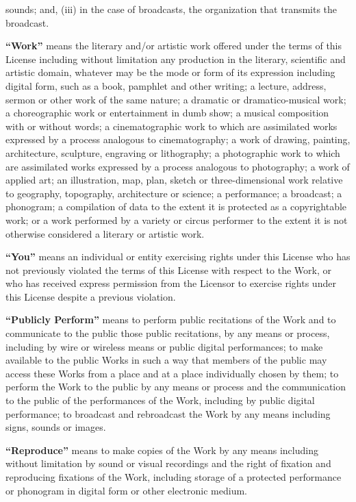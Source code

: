 \begin{doclicense@enumerate}
sounds; and, (iii) in the case of broadcasts, the
organization that transmits the broadcast.
\item \textbf{``Work''} means the literary and/or
artistic work offered under the terms of this License
including without limitation any production in the
literary, scientific and artistic domain, whatever may be
the mode or form of its expression including digital
form, such as a book, pamphlet and other writing; a
lecture, address, sermon or other work of the same
nature; a dramatic or dramatico-musical work; a
choreographic work or entertainment in dumb show; a
musical composition with or without words; a
cinematographic work to which are assimilated works
expressed by a process analogous to cinematography; a
work of drawing, painting, architecture, sculpture,
engraving or lithography; a photographic work to which
are assimilated works expressed by a process analogous to
photography; a work of applied art; an illustration, map,
plan, sketch or three-dimensional work relative to
geography, topography, architecture or science; a
performance; a broadcast; a phonogram; a compilation of
data to the extent it is protected as a copyrightable
work; or a work performed by a variety or circus
performer to the extent it is not otherwise considered a
literary or artistic work.
\item \textbf{``You''} means an individual or entity
exercising rights under this License who has not
previously violated the terms of this License with
respect to the Work, or who has received express
permission from the Licensor to exercise rights under
this License despite a previous violation.
\item \textbf{``Publicly Perform''} means to perform
public recitations of the Work and to communicate to the
public those public recitations, by any means or process,
including by wire or wireless means or public digital
performances; to make available to the public Works in
such a way that members of the public may access these
Works from a place and at a place individually chosen by
them; to perform the Work to the public by any means or
process and the communication to the public of the
performances of the Work, including by public digital
performance; to broadcast and rebroadcast the Work by any
means including signs, sounds or images.
\item \textbf{``Reproduce''} means to make copies of
the Work by any means including without limitation by
sound or visual recordings and the right of fixation and
reproducing fixations of the Work, including storage of a
protected performance or phonogram in digital form or
other electronic medium.
\end{doclicense@enumerate}
